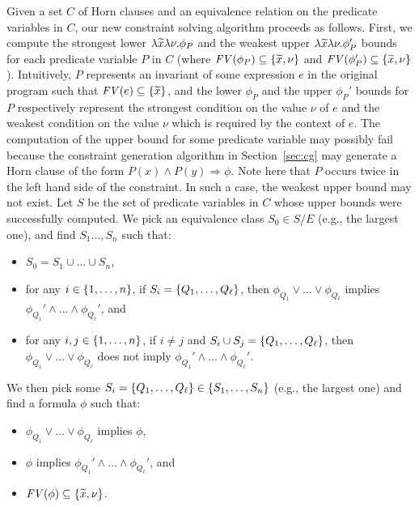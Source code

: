  Given a set \(C\) of 
Horn clauses and an equivalence relation on the predicate variables in 
\(C\), our new constraint solving algorithm proceeds as follows.  First, 
we compute the strongest lower \(\lambda \widetilde{x}\lambda \nu.\phi_P\) and 
the weakest upper \(\lambda \widetilde{x}\lambda \nu.\phi_P'\) bounds for each 
predicate variable \(P\) in \(C\) (where \(\mathit{FV}({\phi_P}) \subseteq 
\{{\widetilde{x},\nu}\}\) and \(\mathit{FV}({\phi_P'}) \subseteq \{{\widetilde{x},\nu}\}\)).  
Intuitively, \(P\) represents an invariant of some expression \(e\) in 
the original program such that \(\mathit{FV}({e}) \subseteq \{{\widetilde{x}}\}\), and 
the lower \(\phi_P\) and the upper \(\phi_{P}'\) bounds for \(P\) 
respectively represent the strongest condition on the value \(\nu\) of 
\(e\) and the weakest condition on the value \(\nu\) which is required 
by the context of \(e\).
%
The computation of the upper bound for some predicate variable may 
possibly fail because the constraint generation algorithm in 
Section~\ref{sec:cg} may generate a Horn clause of the form \(P(x) \land 
P(y) \Rightarrow \phi\).  Note here that \(P\) occurs twice in the left 
hand side of the constraint.  In such a case, the weakest upper bound 
may not exist.
%
Let \(S\) be the set of predicate variables in \(C\) whose upper bounds 
were successfully computed.  We pick an equivalence class \(S_0 \in S / 
E\) (e.g., the largest one), and find \(S_1\dots,S_n\) such that:
\begin{itemize}
\item \(S_0 = S_1 \cup \dots \cup S_n\),
\item for any \(i \in \{{1,\dots,n}\}\), if \(S_i = 
\{{Q_1,\dots,Q_{\ell}}\}\), then \(\phi_{Q_1} \lor \dots \lor 
\phi_{Q_{\ell}}\) implies \(\phi_{Q_1}' \land \dots \land 
\phi_{Q_{\ell}}'\), and
\item for any \(i,j \in \{{1,\dots,n}\}\), if \(i \neq j\) and 
\(S_i \cup S_j = \{{Q_1,\dots,Q_{\ell}}\}\), then \(\phi_{Q_1} \lor 
\dots \lor \phi_{Q_{\ell}}\) does not imply \(\phi_{Q_1}' \land \dots 
\land \phi_{Q_{\ell}}'\).
\end{itemize}
We then pick some \(S_i = \{{Q_1,\dots,Q_{\ell}}\} \in 
\{{S_1,\dots,S_n}\}\) (e.g., the largest one) and find a formula \(\phi\) 
such that:
\begin{itemize}
\item \(\phi_{Q_1} \lor \dots \lor \phi_{Q_{\ell}}\) implies \(\phi\),
\item \(\phi\) implies \(\phi_{Q_1}' \land \dots \land \phi_{Q_{\ell}}'\), and
\item \(\mathit{FV}({\phi}) \subseteq \{{\widetilde{x},\nu}\}\).
\end{itemize}
